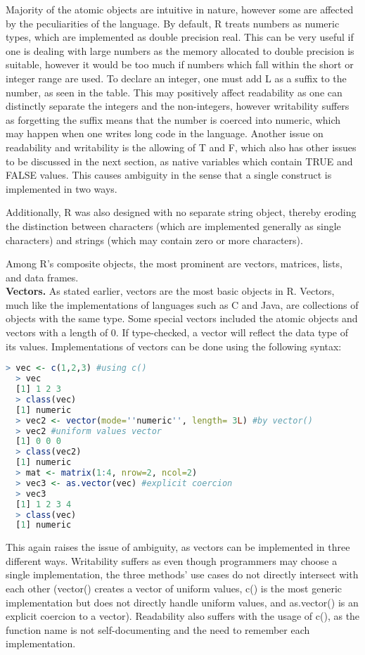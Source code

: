 \documentclass[12pt]{article}
\begin{document}
Majority of the atomic objects are intuitive in nature, however some are affected by the peculiarities of the language. By default, R treats numbers as numeric types, which are implemented as double precision real. This can be very useful if one is dealing with large numbers as the memory allocated to double precision is suitable, however it would be too much if numbers which fall within the short or integer range are used. To declare an integer, one must add L as a suffix to the number, as seen in the table. This may positively affect readability as one can distinctly separate the integers and the non-integers, however writability suffers as forgetting the suffix means that the number is coerced into numeric, which may happen when one writes long code in the language. Another issue on readability and writability is the allowing of T and F, which also has other issues to be discussed in the next section, as native variables which contain TRUE and FALSE values. This causes ambiguity in the sense that a single construct is implemented in two ways.

Additionally, R was also designed with no separate string object, thereby eroding the distinction between characters (which are implemented generally as single characters) and strings (which may contain zero or more characters).

Among R's composite objects, the most prominent are vectors, matrices, lists, and data frames. \\

\textbf{Vectors.} As stated earlier, vectors are the most basic objects in R. Vectors, much like the implementations of languages such as C and Java, are collections of objects with the same type. Some special vectors included the atomic objects and vectors with a length of 0. If type-checked, a vector will reflect the data type of its values. Implementations of vectors can be done using the following syntax:

\begin{lstlisting}[language=R ]
  > vec <- c(1,2,3) #using c()
  > vec
  [1] 1 2 3
  > class(vec)
  [1] numeric
  > vec2 <- vector(mode=''numeric'', length= 3L) #by vector()
  > vec2 #uniform values vector
  [1] 0 0 0
  > class(vec2)
  [1] numeric
  > mat <- matrix(1:4, nrow=2, ncol=2)
  > vec3 <- as.vector(vec) #explicit coercion
  > vec3
  [1] 1 2 3 4
  > class(vec)
  [1] numeric
\end{lstlisting}

This again raises the issue of ambiguity, as vectors can be implemented in three different ways. Writability suffers as even though programmers may choose a single implementation, the three methods' use cases do not directly intersect with each other (vector() creates a vector of uniform values, c() is the most generic implementation but does not directly handle uniform values, and as.vector() is an explicit coercion to a vector). Readability also suffers with the usage of c(), as the function name is not self-documenting and the need to remember each implementation.\\
\end{document}
